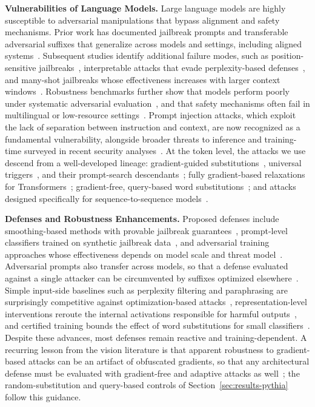 \documentclass{article}
\theoremstyle{plain}
\theoremstyle{definition}
\theoremstyle{remark}
\theoremstyle{plain}
\begin{document}
\textbf{Vulnerabilities of Language Models.}
Large language models are highly susceptible to adversarial manipulations that bypass alignment and safety mechanisms. Prior work has documented jailbreak prompts and transferable adversarial suffixes that generalize across models and settings, including aligned systems~\citep{Zou2023UniversalTransferableAttacksOnAlignedLLMs}. Subsequent studies identify additional failure modes, such as position-sensitive jailbreaks~\citep{wang2025vulnerability}, interpretable attacks that evade perplexity-based defenses~\citep{Zhu2023AutoDAN}, and many-shot jailbreaks whose effectiveness increases with larger context windows~\citep{anil2024many}. Robustness benchmarks further show that models perform poorly under systematic adversarial evaluation~\citep{Wang2021AdvGLUE}, and that safety mechanisms often fail in multilingual or low-resource settings~\citep{deng2024multilingual}. Prompt injection attacks, which exploit the lack of separation between instruction and context, are now recognized as a fundamental vulnerability, alongside broader threats to inference and training-time surveyed in recent security analyses~\citep{li2025security}.
At the token level, the attacks we use descend from a well-developed lineage: gradient-guided substitutions~\citep{ebrahimi2018hotflip}, universal triggers~\citep{wallace2019universal}, and their prompt-search descendants~\citep{shin2020autoprompt}; fully gradient-based relaxations for Transformers~\citep{guo2021gradient}; gradient-free, query-based word substitutions~\citep{jin2020bert}; and attacks designed specifically for sequence-to-sequence models~\citep{cheng2020seq2sick}.

\textbf{Defenses and Robustness Enhancements.}
Proposed defenses include smoothing-based methods with provable jailbreak guarantees~\citep{Robey2023SmoothLLM},
prompt-level classifiers trained on synthetic jailbreak data~\citep{sayeedi2025jailbreaktracer}, and adversarial training approaches whose effectiveness depends on model scale and threat model~\citep{howe2024effects}.
Adversarial prompts also transfer across models, so that a defense evaluated against a single attacker can be circumvented by suffixes optimized elsewhere~\citep{Zou2023UniversalTransferableAttacksOnAlignedLLMs}.
Simple input-side baselines such as perplexity filtering and paraphrasing are surprisingly competitive against optimization-based attacks~\citep{jain2023baseline}, representation-level interventions reroute the internal activations responsible for harmful outputs~\citep{zou2024circuit}, and certified training bounds the effect of word substitutions for small classifiers~\citep{jia2019certified}. Despite these advances, most defenses remain reactive and training-dependent. A recurring lesson from the vision literature is that apparent robustness to gradient-based attacks can be an artifact of obfuscated gradients, so that any architectural defense must be evaluated with gradient-free and adaptive attacks as well~\citep{athalye2018obfuscated,carlini2019evaluating,tramer2020adaptive}; the random-substitution and query-based controls of Section~\ref{sec:results-pythia} follow this guidance.
\end{document}
